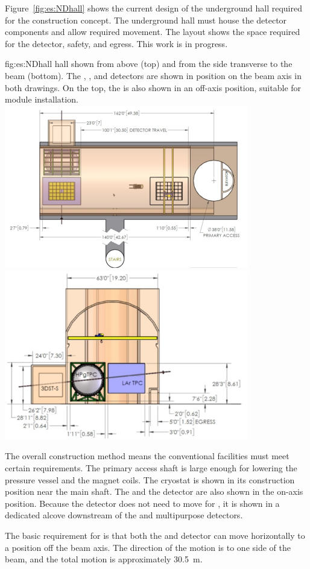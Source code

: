 Figure~\ref{fig:es:NDhall} shows the current design of the underground hall required for the   construction concept. The underground hall must house the detector components and allow required movement. The layout shows the space required for the detector, safety, and egress.  This  work is in progress. 


\begin{dunefigure}{fig:es:NDhall}
{   hall shown from above (top) and from the side transverse to the beam (bottom). The , , and  detectors are shown in position on the beam axis in both drawings.  On the top, the  is also shown in an off-axis position, suitable for module installation. }
\includegraphics[width=0.8\textwidth]{graphics/NDhall1.jpg}
\includegraphics[width=0.8\textwidth]{graphics/NDhall2.jpg}
\end{dunefigure}

The overall construction method means the conventional facilities must meet certain requirements. 
The primary access shaft is large enough for lowering the pressure vessel and the magnet coils. The  cryostat is shown in its construction position near the main shaft. The  and the  detector are also shown in the on-axis position. Because the  detector does not need to move for , it is shown in a dedicated alcove downstream of the  and multipurpose detectors.


The basic requirement for  is that both the  and  detector can move horizontally to a position off the beam axis. The direction of the motion is to one side of the beam, and the total motion is approximately 30.5~m. 





